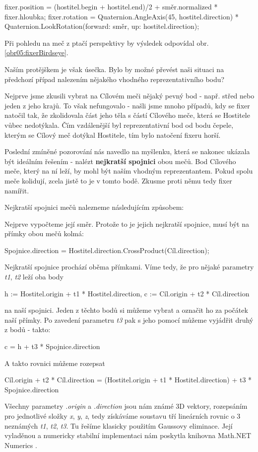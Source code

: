 \begin{code}
fixer.position = 
  (hostitel.begin + hostitel.end)/2 
  + směr.normalized * fixer.hloubka;
fixer.rotation = 
  Quaternion.AngleAxis(45, hostitel.direction)
  * Quaternion.LookRotation(forward: směr, up: hostitel.direction);
\end{code}
Při pohledu na meč z ptačí perspektivy by výsledek odpovídal obr. \ref{obr05:fixerBirdseye}. 

\bigbreak

Naším protějškem je však úsečka. Bylo by možné převést naši situaci na předchozí případ nalezením nějakého vhodného reprezentativního bodu?

Nejprve jsme zkusili vybrat na Cílovém meči nějaký pevný bod - např. střed nebo jeden z jeho krajů. To však nefungovalo - našli jsme mnoho případů, kdy se fixer natočil tak, že zkolidovala část jeho těla s částí Cílového meče, která se Hostitele vůbec nedotýkala. Čím vzdálenější byl reprezentativní bod od bodu čepele, kterým se Cílový meč dotýkal Hostitele, tím bylo natočení fixeru horší.

Poslední zmíněné pozorování nás navedlo na myšlenku, která se nakonec ukázala být ideálním řešením - nalézt \textbf{nejkratší spojnici} obou mečů. Bod Cílového meče, který na ní leží, by mohl být naším vhodným reprezentantem. Pokud spolu meče kolidují, zcela jistě to je v tomto bodě. Zkusme proti němu tedy fixer namířit. 

\bigbreak

Nejkratší spojnici mečů nalezneme následujícím způsobem:

Nejprve vypočteme její směr. Protože to je jejich nejkratší spojnice, musí být na přímky obou mečů kolmá:
\begin{code}
 Spojnice.direction = Hostitel.direction.CrossProduct(Cíl.direction);
\end{code}

Nejkratší spojnice prochází oběma přímkami. Víme tedy, že pro nějaké parametry \textit{t1}, \textit{t2} leží oba body
\begin{code}
 h := Hostitel.origin + t1 * Hostitel.direction,
 c := Cíl.origin + t2 * Cíl.direction
\end{code}
na naší spojnici. Jeden z těchto bodů si můžeme vybrat a označit ho za počátek naší přímky. Po zavedení parametru \textit{t3} pak s jeho pomocí můžeme vyjádřit druhý z bodů - takto:
\begin{code}
  c = h + t3 * Spojnice.direction
\end{code}
A takto rovnici můžeme rozepsat
\begin{code}
 Cíl.origin + t2 * Cíl.direction =
 (Hostitel.origin + t1 * Hostitel.direction) + t3 * Spojnice.direction
\end{code}
Všechny parametry \textit{.origin} a \textit{.direction} jsou nám známé 3D vektory, rozepsáním pro jednotlivé složky \textit{x}, \textit{y}, \textit{z}, tedy získáváme soustavu tří lineárních rovnic o 3 neznámých \textit{t1}, \textit{t2}, \textit{t3}. Tu řešíme klasicky použitím Gaussovy eliminace. Její vyladěnou a numericky stabilní implementaci nám poskytla knihovna Math.NET Numerics \cite{MathDotNetNumerics}.


